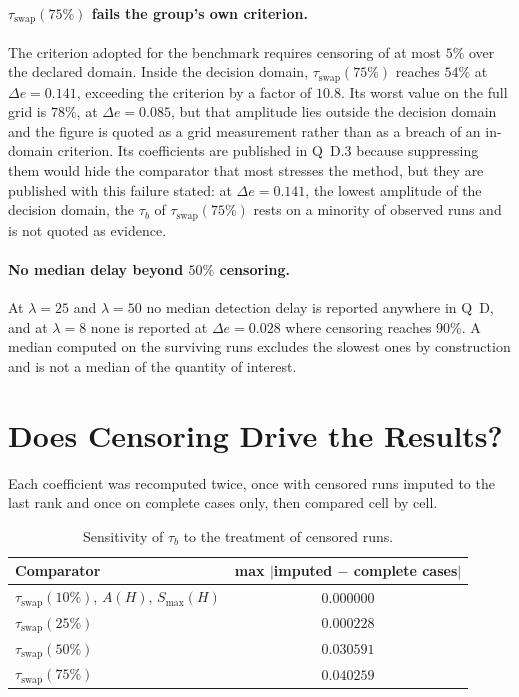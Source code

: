 \documentclass[11pt,a4paper]{article}
\begin{document}
\paragraph{$\tau_{\mathrm{swap}}(75\%)$ fails the group's own criterion.} The criterion
adopted for the benchmark requires censoring of at most $5\%$ over the declared domain.
Inside the decision domain, $\tau_{\mathrm{swap}}(75\%)$ reaches $54\%$ at
$\Delta e = 0.141$, exceeding the criterion by a factor of $10.8$. Its worst value on the
full grid is $78\%$, at $\Delta e = 0.085$, but that amplitude lies outside the decision
domain and the figure is quoted as a grid measurement rather than as a breach of an
in-domain criterion. Its coefficients are published in Q~D.3 because suppressing them would
hide the comparator that most stresses the method, but they are published with this failure
stated: at $\Delta e = 0.141$, the lowest amplitude of the decision domain, the $\tau_b$ of
$\tau_{\mathrm{swap}}(75\%)$ rests on a minority of observed runs and is not quoted as
evidence.

\paragraph{No median delay beyond $50\%$ censoring.} At $\lambda = 25$ and $\lambda = 50$
no median detection delay is reported anywhere in Q~D, and at $\lambda = 8$ none is
reported at $\Delta e = 0.028$ where censoring reaches $90\%$. A median computed on the
surviving runs excludes the slowest ones by construction and is not a median of the
quantity of interest.

\section{Does Censoring Drive the Results?}

Each coefficient was recomputed twice, once with censored runs imputed to the last rank and
once on complete cases only, then compared cell by cell.

\begin{table}[htbp]
  \centering
  \begin{tabular}{lc}
    \toprule
    Comparator & max $|$imputed $-$ complete cases$|$ \\
    \midrule
    $\tau_{\mathrm{swap}}(10\%)$, $A(H)$, $S_{\max}(H)$ & $0.000000$ \\
    $\tau_{\mathrm{swap}}(25\%)$ & $0.000228$ \\
    $\tau_{\mathrm{swap}}(50\%)$ & $0.030591$ \\
    $\tau_{\mathrm{swap}}(75\%)$ & $0.040259$ \\
    \bottomrule
  \end{tabular}
  \caption{Sensitivity of $\tau_b$ to the treatment of censored runs.}
  \label{tab:cascomplets}
\end{table}
\end{document}
